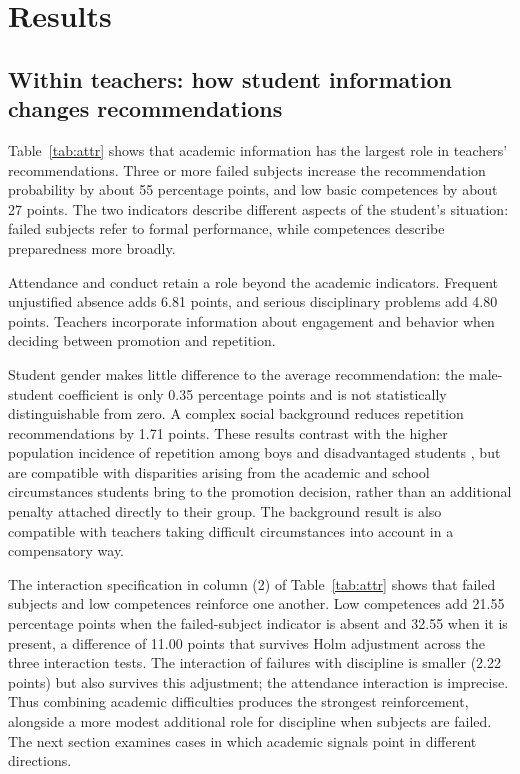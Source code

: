 \section{Results}\label{sec:results}
\subsection{Within teachers: how student information changes recommendations}
Table~\ref{tab:attr} shows that academic information has the largest role in teachers' recommendations. Three or more failed subjects increase the recommendation probability by about 55 percentage points, and low basic competences by about 27 points. The two indicators describe different aspects of the student's situation: failed subjects refer to formal performance, while competences describe preparedness more broadly.


Attendance and conduct retain a role beyond the academic indicators. Frequent unjustified absence adds 6.81 points, and serious disciplinary problems add 4.80 points. Teachers incorporate information about engagement and behavior when deciding between promotion and repetition.

Student gender makes little difference to the average recommendation: the male-student coefficient is only 0.35 percentage points and is not statistically distinguishable from zero. A complex social background reduces repetition recommendations by 1.71 points. These results contrast with the higher population incidence of repetition among boys and disadvantaged students \citep{oecd}, but are compatible with disparities arising from the academic and school circumstances students bring to the promotion decision, rather than an additional penalty attached directly to their group. The background result is also compatible with teachers taking difficult circumstances into account in a compensatory way.

The interaction specification in column (2) of Table~\ref{tab:attr} shows that failed subjects and low competences reinforce one another. Low competences add 21.55 percentage points when the failed-subject indicator is absent and 32.55 when it is present, a difference of 11.00 points that survives Holm adjustment across the three interaction tests. The interaction of failures with discipline is smaller (2.22 points) but also survives this adjustment; the attendance interaction is imprecise. Thus combining academic difficulties produces the strongest reinforcement, alongside a more modest additional role for discipline when subjects are failed. The next section examines cases in which academic signals point in different directions.


